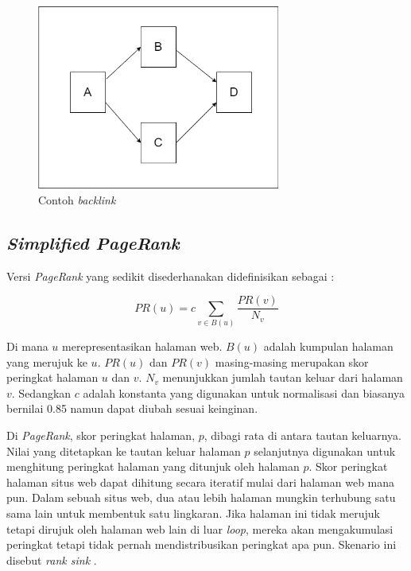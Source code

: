 \begin{figure}[H]
	\centering
	\includegraphics[keepaspectratio, width=8cm]{gambar/contoh_backlink}
	\caption{Contoh \textit{backlink}}
	\label{gambar:contoh_backlink}
\end{figure}

\subsection{\textit{Simplified PageRank}}
Versi \textit{PageRank} yang sedikit disederhanakan didefinisikan sebagai \citep{page1999pagerank}:

\begin{equation}
PR(u) = c \sum_{v \in B(u)}^{} \frac{PR(v)}{N_{v}}
\end{equation}

Di mana $u$ merepresentasikan halaman web. $B(u)$ adalah kumpulan halaman yang merujuk ke $u$. $PR(u)$ dan $PR(v)$ masing-masing merupakan skor peringkat halaman $u$ dan $v$. $N_{v}$ menunjukkan jumlah tautan keluar dari halaman $v$. Sedangkan $c$ adalah konstanta yang digunakan untuk normalisasi dan biasanya bernilai 0.85 namun dapat diubah sesuai keinginan.

Di \textit{PageRank}, skor peringkat halaman, $p$, dibagi rata di antara tautan keluarnya. Nilai yang ditetapkan ke tautan keluar halaman $p$ selanjutnya digunakan untuk menghitung peringkat halaman yang ditunjuk oleh halaman $p$. Skor peringkat halaman situs web dapat dihitung secara iteratif mulai dari halaman web mana pun. Dalam sebuah situs web, dua atau lebih halaman mungkin terhubung satu sama lain untuk membentuk satu lingkaran. Jika halaman ini tidak merujuk tetapi dirujuk oleh halaman web lain di luar \textit{loop}, mereka akan mengakumulasi peringkat tetapi tidak pernah mendistribusikan peringkat apa pun. Skenario ini disebut \textit{rank sink} \citep{page1999pagerank}.

